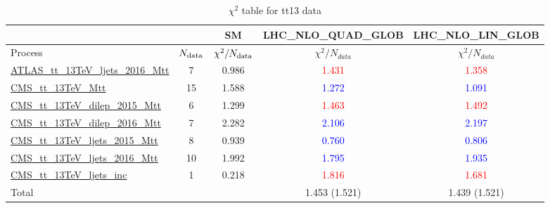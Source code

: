 \documentclass{article}
\begin{document}
\begin{table}[H]
\centering
\begin{tabular}{|l|c|c|c|c|}
\hline
 \multicolumn{2}{|c|}{} & SM& LHC_NLO_QUAD_GLOB& LHC_NLO_LIN_GLOB\\ \hline
Process & $N_{\rm data}$ & $\chi^ 2/N_{\rm data}$& $\chi^ 2/N_{data}$& $\chi^ 2/N_{data}$\\ \hline
\href{https://arxiv.org}{ATLAS_tt_13TeV_ljets_2016_Mtt} & 7 & 0.986 & \textcolor{red}                            {1.431} & \textcolor{red}                            {1.358} \\ \hline
\href{https://arxiv.org}{CMS_tt_13TeV_Mtt} & 15 & 1.588 & \textcolor{blue}                            {1.272} & \textcolor{blue}                            {1.091} \\ \hline
\href{https://arxiv.org}{CMS_tt_13TeV_dilep_2015_Mtt} & 6 & 1.299 & \textcolor{red}                            {1.463} & \textcolor{red}                            {1.492} \\ \hline
\href{https://arxiv.org}{CMS_tt_13TeV_dilep_2016_Mtt} & 7 & 2.282 & \textcolor{blue}                            {2.106} & \textcolor{blue}                            {2.197} \\ \hline
\href{https://arxiv.org}{CMS_tt_13TeV_ljets_2015_Mtt} & 8 & 0.939 & \textcolor{blue}                            {0.760} & \textcolor{blue}                            {0.806} \\ \hline
\href{https://arxiv.org}{CMS_tt_13TeV_ljets_2016_Mtt} & 10 & 1.992 & \textcolor{blue}                            {1.795} & \textcolor{blue}                            {1.935} \\ \hline
\href{https://arxiv.org}{CMS_tt_13TeV_ljets_inc} & 1 & 0.218 & \textcolor{red}                            {1.816} & \textcolor{red}                            {1.681} \\ \hline
\hline Total & &  & 1.453 (1.521) & 1.439 (1.521) \\ \hline
\end{tabular}
\caption{$\chi^2$ table for tt13 data}
\end{table}
\end{document}
